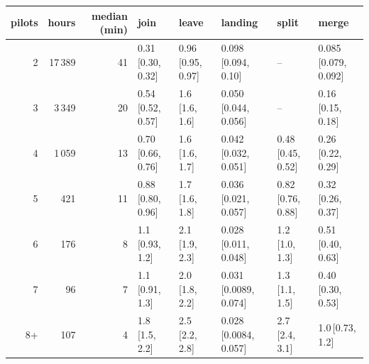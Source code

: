 \begin{tabular}{@{}r r r l l l l l@{}}
\toprule
pilots & hours & median (min) & join & leave & landing & split & merge \\
\midrule
2 & 17\,389 & 41 & 0.31\,{\tiny[0.30, 0.32]} & 0.96\,{\tiny[0.95, 0.97]} & 0.098\,{\tiny[0.094, 0.10]} & -- & 0.085\,{\tiny[0.079, 0.092]} \\
3 & 3\,349 & 20 & 0.54\,{\tiny[0.52, 0.57]} & 1.6\,{\tiny[1.6, 1.6]} & 0.050\,{\tiny[0.044, 0.056]} & -- & 0.16\,{\tiny[0.15, 0.18]} \\
4 & 1\,059 & 13 & 0.70\,{\tiny[0.66, 0.76]} & 1.6\,{\tiny[1.6, 1.7]} & 0.042\,{\tiny[0.032, 0.051]} & 0.48\,{\tiny[0.45, 0.52]} & 0.26\,{\tiny[0.22, 0.29]} \\
5 & 421 & 11 & 0.88\,{\tiny[0.80, 0.96]} & 1.7\,{\tiny[1.6, 1.8]} & 0.036\,{\tiny[0.021, 0.057]} & 0.82\,{\tiny[0.76, 0.88]} & 0.32\,{\tiny[0.26, 0.37]} \\
6 & 176 & 8 & 1.1\,{\tiny[0.93, 1.2]} & 2.1\,{\tiny[1.9, 2.3]} & 0.028\,{\tiny[0.011, 0.048]} & 1.2\,{\tiny[1.0, 1.3]} & 0.51\,{\tiny[0.40, 0.63]} \\
7 & 96 & 7 & 1.1\,{\tiny[0.91, 1.3]} & 2.0\,{\tiny[1.8, 2.2]} & 0.031\,{\tiny[0.0089, 0.074]} & 1.3\,{\tiny[1.1, 1.5]} & 0.40\,{\tiny[0.30, 0.53]} \\
8+ & 107 & 4 & 1.8\,{\tiny[1.5, 2.2]} & 2.5\,{\tiny[2.2, 2.8]} & 0.028\,{\tiny[0.0084, 0.057]} & 2.7\,{\tiny[2.4, 3.1]} & 1.0\,{\tiny[0.73, 1.2]} \\
\bottomrule
\end{tabular}

